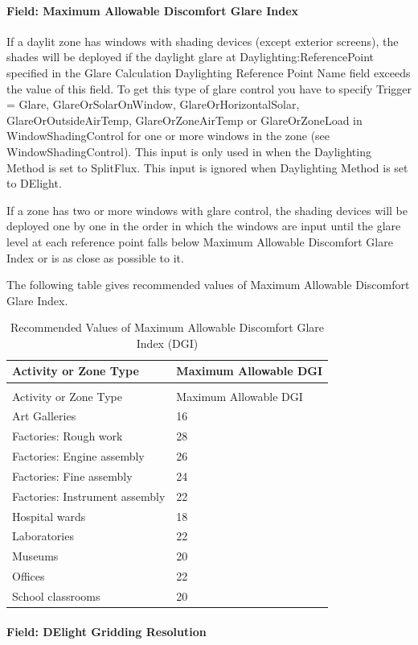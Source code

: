 \paragraph{Field: Maximum Allowable Discomfort Glare Index}\label{field-maximum-allowable-discomfort-glare-index}

If a daylit zone has windows with shading devices (except exterior screens), the shades will be deployed if the daylight glare at Daylighting:ReferencePoint specified in the Glare Calculation Daylighting Reference Point Name field exceeds the value of this field. To get this type of glare control you have to specify Trigger = Glare, GlareOrSolarOnWindow, GlareOrHorizontalSolar, GlareOrOutsideAirTemp, GlareOrZoneAirTemp or GlareOrZoneLoad in WindowShadingControl for one or more windows in the zone (see WindowShadingControl). This input is only used in when the Daylighting Method is set to SplitFlux. This input is ignored when Daylighting Method is set to DElight.

If a zone has two or more windows with glare control, the shading devices will be deployed one by one in the order in which the windows are input until the glare level at each reference point falls below Maximum Allowable Discomfort Glare Index or is as close as possible to it.

The following table gives recommended values of Maximum Allowable Discomfort Glare Index.

\begin{longtable}[c]{@{}ll@{}}
\caption{Recommended Values of Maximum Allowable Discomfort Glare Index (DGI) \label{table:recommended-values-discomfort-glare-index}} \tabularnewline
\toprule 
Activity or Zone Type & Maximum Allowable DGI \tabularnewline
\midrule
\endfirsthead

\caption[]{Recommended Values of Maximum Allowable Discomfort Glare Index (DGI)} \tabularnewline
\toprule 
Activity or Zone Type & Maximum Allowable DGI \tabularnewline
\midrule
\endhead

Art Galleries & 16 \tabularnewline
Factories: Rough work & 28 \tabularnewline
Factories: Engine assembly & 26 \tabularnewline
Factories: Fine assembly & 24 \tabularnewline
Factories: Instrument assembly & 22 \tabularnewline
Hospital wards & 18 \tabularnewline
Laboratories & 22 \tabularnewline
Museums & 20 \tabularnewline
Offices & 22 \tabularnewline
School classrooms & 20 \tabularnewline
\bottomrule
\end{longtable}

\paragraph{Field: DElight Gridding Resolution}\label{field-gridding-resolution}

